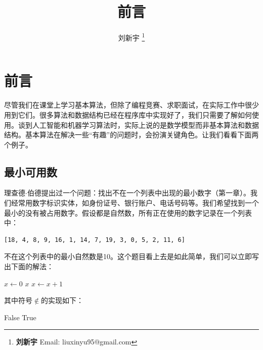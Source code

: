 \documentclass[b5paper, punct=kaiming]{ctexart}
\begin{document}
\title{前言}

\author{刘新宇
\thanks{{\bfseries 刘新宇} \newline
  Email: liuxinyu95@gmail.com \newline}
  }

\maketitle
\fi


\chapter*{前言}

尽管我们在课堂上学习基本算法，但除了编程竞赛、求职面试，在实际工作中很少用到它们。很多算法和数据结构已经在程序库中实现好了，我们只需要了解如何使用。谈到人工智能和机器学习算法时，实际上说的是数学模型而非基本算法和数据结构。基本算法在解决一些“有趣”的问题时，会扮演关键角色。让我们看看下面两个例子。

\section*{最小可用数}
\label{min-free} 

理查德$\cdot$伯德提出过一个问题：找出不在一个列表中出现的最小数字（\cite{fp-pearls}第一章）。我们经常用数字标识实体，如身份证号、银行账户、电话号码等。我们希望找到一个最小的没有被占用数字。假设都是自然数，所有正在使用的数字记录在一个列表中：

\begin{Verbatim}[fontsize=\footnotesize]
[18, 4, 8, 9, 16, 1, 14, 7, 19, 3, 0, 5, 2, 11, 6]
\end{Verbatim}

不在这个列表中的最小自然数是10。这个题目看上去是如此简单，我们可以立即写出下面的解法：

\begin{algorithmic}[1]
  \State $x \gets 0$
  \Loop
      \State \Return $x$
    \Else
      \State $x \gets x + 1$
    \EndIf
  \EndLoop
\EndFunction
\end{algorithmic}

其中符号$\notin$的实现如下：

\begin{algorithmic}[1]
      \State \Return False
    \EndIf
  \EndFor
  \State \Return True
\EndFunction
\end{algorithmic}
\end{document}
